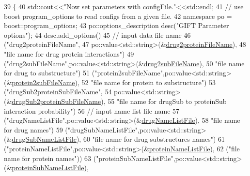 \begin{DoxyCode}
39                                                                     \{
40     std::cout<<\textcolor{stringliteral}{"Now set parameters with configFile."}<<std::endl;
41     \textcolor{comment}{// use boost program\_options to read configs from a given file.}
42     \textcolor{keyword}{namespace }po = boost::program\_options;
43     po::options\_description desc(\textcolor{stringliteral}{"GIFT Parameter options"});
44     desc.add\_options()
45       \textcolor{comment}{// input data file name}
46       (\textcolor{stringliteral}{"drug2proteinFileName"},
47        po::value<std::string>(&\hyperlink{classgift_1_1parameters_a61fc22423e89322e853c5eecebee3808}{drug2proteinFileName}),
48        \textcolor{stringliteral}{"file name for drug protein interactions"})
49       (\textcolor{stringliteral}{"drug2subFileName"},po::value<std::string>(&\hyperlink{classgift_1_1parameters_aa27081bc09725a965312c44ea26e4ba8}{drug2subFileName}),
50        \textcolor{stringliteral}{"file name for drug to substructure"})
51       (\textcolor{stringliteral}{"protein2subFileName"},po::value<std::string>(&\hyperlink{classgift_1_1parameters_a2c450bde4fa0d68a858ce1007d2202c0}{protein2subFileName}),
52        \textcolor{stringliteral}{"file name for protein to substructure"})
53       (\textcolor{stringliteral}{"drugSub2proteinSubFileName"},
54        po::value<std::string>(&\hyperlink{classgift_1_1parameters_a9a245f231438683010d85aa618bd6bd4}{drugSub2proteinSubFileName}),
55        \textcolor{stringliteral}{"file name for drugSub to proteinSub interaction probability"})
56       \textcolor{comment}{// input name list file name}
57       (\textcolor{stringliteral}{"drugNameListFile"},po::value<std::string>(&\hyperlink{classgift_1_1parameters_ad7f26adc041d62b07fa99385565f51a1}{drugNameListFile}),
58        \textcolor{stringliteral}{"file name for drug names"})
59       (\textcolor{stringliteral}{"drugSubNameListFile"},po::value<std::string>(&\hyperlink{classgift_1_1parameters_a9bc090c30495e569533f32198d5d92ae}{drugSubNameListFile}),
60        \textcolor{stringliteral}{"file name for drug substructures names"})
61       (\textcolor{stringliteral}{"proteinNameListFile"},po::value<std::string>(&\hyperlink{classgift_1_1parameters_aaa3fbb7fb15202e1c87b3e93ce5b5e03}{proteinNameListFile}),
62        (\textcolor{stringliteral}{"file name for protein names"}))
63       (\textcolor{stringliteral}{"proteinSubNameListFile"},po::value<std::string>(&\hyperlink{classgift_1_1parameters_a24da583f5d710acc0db17a6e712adcdd}{proteinSubNameListFile}),

\end{DoxyCode}
